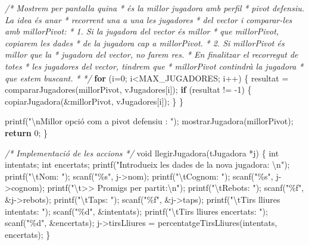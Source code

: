 \documentclass[]{book}
\newenvironment{Shaded}{\begin{snugshade}}{\end{snugshade}}
\newcommand{\CommentTok}[1]{\textcolor[rgb]{0.56,0.35,0.01}{\textit{#1}}}
\newcommand{\ControlFlowTok}[1]{\textcolor[rgb]{0.13,0.29,0.53}{\textbf{#1}}}
\newcommand{\DataTypeTok}[1]{\textcolor[rgb]{0.13,0.29,0.53}{#1}}
\newcommand{\DecValTok}[1]{\textcolor[rgb]{0.00,0.00,0.81}{#1}}
\newcommand{\NormalTok}[1]{#1}
\newcommand{\SpecialCharTok}[1]{\textcolor[rgb]{0.00,0.00,0.00}{#1}}
\newcommand{\StringTok}[1]{\textcolor[rgb]{0.31,0.60,0.02}{#1}}
\begin{document}
\begin{Shaded}
\begin{Highlighting}[]
    \CommentTok{/* Mostrem per pantalla quina}
\CommentTok{     * és la millor jugadora amb perfil}
\CommentTok{     * pivot defensiu. La idea és anar}
\CommentTok{     * recorrent una a una les jugadores}
\CommentTok{     * del vector i comparar{-}les amb millorPivot:}
\CommentTok{     * 1. Si la jugadora del vector és millor}
\CommentTok{     *    que millorPivot, copiarem les dades}
\CommentTok{     *    de la jugadora cap a millorPivot.}
\CommentTok{     * 2. Si millorPivot és millor que la}
\CommentTok{     *    jugadora del vector, no farem res.}
\CommentTok{     * En finalitzar el recorregut de totes}
\CommentTok{     * les jugadores del vector, tindrem que}
\CommentTok{     * millorPivot contindrà la jugadora}
\CommentTok{     * que estem buscant.}
\CommentTok{     * */}
    \ControlFlowTok{for}\NormalTok{ (i=}\DecValTok{0}\NormalTok{; i\textless{}MAX\_JUGADORES; i++) \{}
\NormalTok{        resultat = compararJugadores(millorPivot, vJugadores[i]);}
        \ControlFlowTok{if}\NormalTok{ (resultat != {-}}\DecValTok{1}\NormalTok{) \{}
\NormalTok{            copiarJugadora(\&millorPivot, vJugadores[i]);}
\NormalTok{        \}}
\NormalTok{    \}}
    
\NormalTok{    printf(}\StringTok{"}\SpecialCharTok{\textbackslash{}n}\StringTok{Millor opció com a pivot defensiu : "}\NormalTok{);}
\NormalTok{    mostrarJugadora(millorPivot);}
    \ControlFlowTok{return} \DecValTok{0}\NormalTok{;}
\NormalTok{\}}

\CommentTok{/* Implementació de les accions */}
\DataTypeTok{void}\NormalTok{ llegirJugadora(tJugadora *j) \{}
    \DataTypeTok{int}\NormalTok{ intentats;}
    \DataTypeTok{int}\NormalTok{ encertats;}
\NormalTok{    printf(}\StringTok{"Introdueix les dades de la nova jugadora: }\SpecialCharTok{\textbackslash{}n}\StringTok{"}\NormalTok{);}
\NormalTok{    printf(}\StringTok{"}\SpecialCharTok{\textbackslash{}t}\StringTok{Nom: "}\NormalTok{);}
\NormalTok{    scanf(}\StringTok{"\%s"}\NormalTok{, j{-}\textgreater{}nom);}
\NormalTok{    printf(}\StringTok{"}\SpecialCharTok{\textbackslash{}t}\StringTok{Cognom: "}\NormalTok{);}
\NormalTok{    scanf(}\StringTok{"\%s"}\NormalTok{, j{-}\textgreater{}cognom);}
\NormalTok{    printf(}\StringTok{"}\SpecialCharTok{\textbackslash{}t}\StringTok{\textgreater{}\textgreater{} Promigs per partit:}\SpecialCharTok{\textbackslash{}n}\StringTok{"}\NormalTok{);}
\NormalTok{    printf(}\StringTok{"}\SpecialCharTok{\textbackslash{}t}\StringTok{Rebots: "}\NormalTok{);}
\NormalTok{    scanf(}\StringTok{"\%f"}\NormalTok{, \&j{-}\textgreater{}rebots);}
\NormalTok{    printf(}\StringTok{"}\SpecialCharTok{\textbackslash{}t}\StringTok{Taps: "}\NormalTok{);}
\NormalTok{    scanf(}\StringTok{"\%f"}\NormalTok{, \&j{-}\textgreater{}taps);}
\NormalTok{    printf(}\StringTok{"}\SpecialCharTok{\textbackslash{}t}\StringTok{Tirs lliures intentats: "}\NormalTok{);}
\NormalTok{    scanf(}\StringTok{"\%d"}\NormalTok{, \&intentats);}
\NormalTok{    printf(}\StringTok{"}\SpecialCharTok{\textbackslash{}t}\StringTok{Tirs lliures encertats: "}\NormalTok{);}
\NormalTok{    scanf(}\StringTok{"\%d"}\NormalTok{, \&encertats);}
\NormalTok{    j{-}\textgreater{}tirsLliures = percentatgeTirsLliures(intentats, encertats);}
\NormalTok{\}}


\end{Highlighting}
\end{Shaded}
\end{document}
